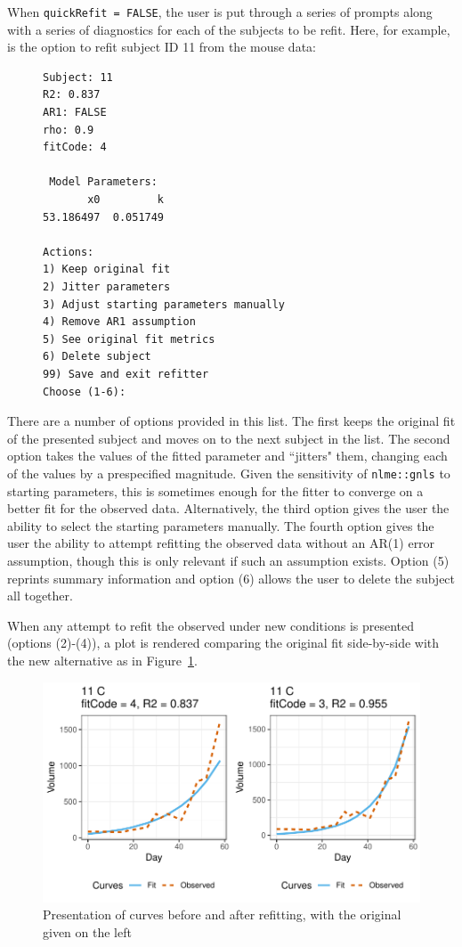 \documentclass{article}
\newcommand{\xt}{\texttt}%
\begin{document}
When \xt{quickRefit = FALSE}, the user is put through a series of prompts along with a series of diagnostics for each of the subjects to be refit. Here, for example, is the option to refit subject ID 11 from the mouse data:

\begin{singlespace}
\begin{figure}[H]
\centering
\begin{BVerbatim}
Subject: 11
R2: 0.837
AR1: FALSE
rho: 0.9
fitCode: 4

 Model Parameters:
       x0         k 
53.186497  0.051749 

Actions:
1) Keep original fit
2) Jitter parameters
3) Adjust starting parameters manually
4) Remove AR1 assumption
5) See original fit metrics
6) Delete subject
99) Save and exit refitter
Choose (1-6):
\end{BVerbatim}
\end{figure}
\end{singlespace}

There are a number of options provided in this list. The first keeps the original fit of the presented subject and moves on to the next subject in the list. The second option takes the values of the fitted parameter and ``jitters" them, changing each of the values by a prespecified magnitude. Given the sensitivity of \xt{nlme::gnls} to starting parameters, this is sometimes enough for the fitter to converge on a better fit for the observed data. Alternatively, the third option gives the user the ability to select the starting parameters manually. The fourth option gives the user the ability to attempt refitting the observed data without an AR(1) error assumption, though this is only relevant if such an assumption exists. Option (5) reprints summary information and option (6) allows the user to delete the subject all together.

When any attempt to refit the observed under new conditions is presented (options (2)-(4)), a plot is rendered comparing the original fit side-by-side with the new alternative as in Figure~\ref{fig:refit_plot}.

\begin{figure}[H]
\centering
\includegraphics{img/mouse_refit_plot.pdf}
\caption{Presentation of curves before and after refitting, with the original given on the left}
\label{fig:refit_plot}
\end{figure}
\end{document}
